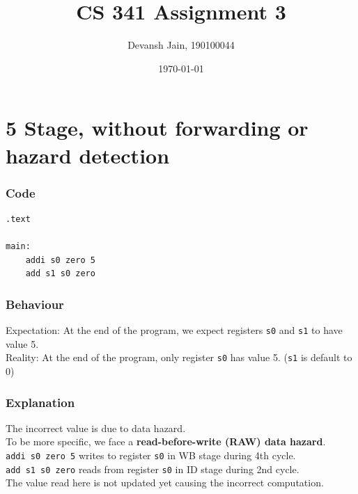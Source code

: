 \documentclass[12pt, fleqn]{article}
\title{CS 341 Assignment 3}
\author{Devansh Jain, 190100044}
\date{\today}
\begin{document}
\maketitle
\tableofcontents
\thispagestyle{empty}
\setcounter{page}{0}

\newpage
\section{5 Stage, without forwarding or hazard detection}

\subsubsection*{Code}
\begin{verbatim}
.text

main:
    addi s0 zero 5
    add s1 s0 zero
\end{verbatim}

\subsubsection*{Behaviour}
Expectation: At the end of the program, we expect registers \verb!s0! and \verb!s1! to have value 5. \\
Reality: At the end of the program, only register \verb!s0! has value 5. (\verb!s1! is default to 0)

\subsubsection*{Explanation}
The incorrect value is due to data hazard. \\
To be more specific, we face a \textbf{read-before-write (RAW) data hazard}. \\
\verb!addi s0 zero 5! writes to register \verb!s0! in WB stage during 4th cycle. \\
\verb!add s1 s0 zero! reads from register \verb!s0! in ID stage during 2nd cycle. \\
The value read here is not updated yet causing the incorrect computation.
\end{document}
